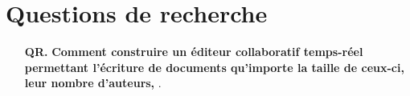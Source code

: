 
\section{Questions de recherche}

\begin{itemize}
\item [\textbf{QR.}] \textbf{Comment construire un éditeur collaboratif temps-réel
    permettant l'écriture de documents qu'importe la taille de ceux-ci, leur
    nombre d'auteurs,  }.
\end{itemize}